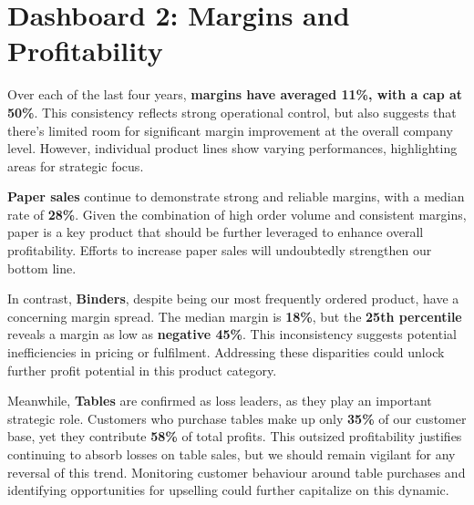 \documentclass[12pt,a4paper]{article}
\begin{document}
\restoregeometry

\newpage

\section{Dashboard 2: Margins and Profitability}

Over each of the last four years, \textbf{margins have averaged 11\%, with a cap at 50\%}. This consistency reflects strong operational control, but also suggests that there’s limited room for significant margin improvement at the overall company level. However, individual product lines show varying performances, highlighting areas for strategic focus.

\textbf{Paper sales} continue to demonstrate strong and reliable margins, with a median rate of \textbf{28\%}. Given the combination of high order volume and consistent margins, paper is a key product that should be further leveraged to enhance overall profitability. Efforts to increase paper sales will undoubtedly strengthen our bottom line.

In contrast, \textbf{Binders}, despite being our most frequently ordered product, have a concerning margin spread. The median margin is \textbf{18\%}, but the \textbf{25th percentile} reveals a margin as low as \textbf{negative 45\%}. This inconsistency suggests potential inefficiencies in pricing or fulfilment. Addressing these disparities could unlock further profit potential in this product category.

Meanwhile, \textbf{Tables} are confirmed as loss leaders, as they play an important strategic role. Customers who purchase tables make up only \textbf{35\%} of our customer base, yet they contribute \textbf{58\%} of total profits. This outsized profitability justifies continuing to absorb losses on table sales, but we should remain vigilant for any reversal of this trend. Monitoring customer behaviour around table purchases and identifying opportunities for upselling could further capitalize on this dynamic.

\vspace*{-0.5cm} %
\end{document}

